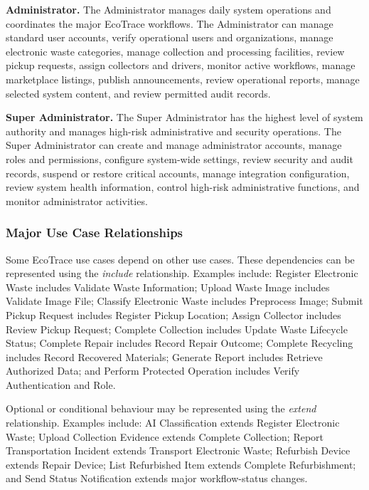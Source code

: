 \textbf{Administrator.} The Administrator manages daily system operations
and coordinates the major EcoTrace workflows. The Administrator can manage
standard user accounts, verify operational users and organizations, manage
electronic waste categories, manage collection and processing facilities,
review pickup requests, assign collectors and drivers, monitor active
workflows, manage marketplace listings, publish announcements, review
operational reports, manage selected system content, and review permitted
audit records.

\textbf{Super Administrator.} The Super Administrator has the highest level
of system authority and manages high-risk administrative and security
operations. The Super Administrator can create and manage administrator
accounts, manage roles and permissions, configure system-wide settings,
review security and audit records, suspend or restore critical accounts, manage
integration configuration, review system health information, control
high-risk administrative functions, and monitor administrator activities.

\subsubsection{Major Use Case Relationships}

Some EcoTrace use cases depend on other use cases. These dependencies can
be represented using the \emph{include} relationship. Examples include:
Register Electronic Waste includes Validate Waste Information; Upload Waste
Image includes Validate Image File; Classify Electronic Waste includes
Preprocess Image; Submit Pickup Request includes Register Pickup Location;
Assign Collector includes Review Pickup Request; Complete Collection
includes Update Waste Lifecycle Status; Complete Repair includes Record
Repair Outcome; Complete Recycling includes Record Recovered Materials;
Generate Report includes Retrieve Authorized Data; and Perform Protected
Operation includes Verify Authentication and Role.

Optional or conditional behaviour may be represented using the
\emph{extend} relationship. Examples include: AI Classification extends
Register Electronic Waste; Upload Collection Evidence extends Complete
Collection; Report Transportation Incident extends Transport Electronic
Waste; Refurbish Device extends Repair Device; List Refurbished Item extends
Complete Refurbishment; and Send Status Notification extends major
workflow-status changes.

